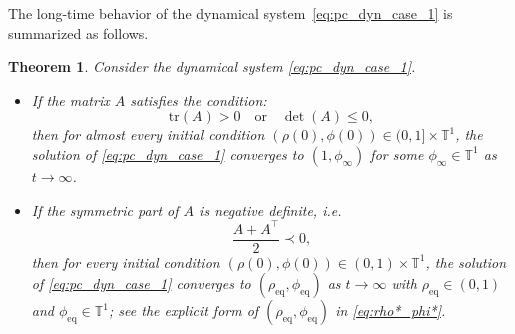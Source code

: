 \documentclass[10pt]{article}
\newtheorem{theorem}{Theorem}[section]
\theoremstyle{definition}
\theoremstyle{definition}
\numberwithin{equation}{section}
\newcommand{\BBT}{\mathbb{T}}
\newcommand{\aDMinus}{a_-^{\text{d}}}
\newcommand{\aOPlus}{a_+^{\text{o}}}
\newcommand{\tr}[1]{\mathrm{tr}(#1)}
\newcommand{\eq}{\mathrm{eq}}
\newcommand{\PhiA}{\Phi_{A}}
\begin{document}
The long-time behavior of the dynamical system~\eqref{eq:pc_dyn_case_1} is summarized as follows.

\begin{theorem}\label{thm:case_1}
Consider the dynamical system \eqref{eq:pc_dyn_case_1}.
\begin{itemize}
    \item[1.] If the matrix $A$ satisfies the condition:
    \begin{equation} \label{eq:case1_condition_E1}
    \tr{A} > 0 \quad \text{or} \quad  \det(A) \leq 0,
    \end{equation}
    then for almost every initial condition $(\rho(0), \phi(0)) \in (0,1] \times \BBT^1$, the solution of \eqref{eq:pc_dyn_case_1} converges to $(1, \phi_{\infty})$ for some $\phi_{\infty} \in \BBT^1$ as $t \rightarrow \infty$.

    \item[2.] If the symmetric part of $A$ is negative definite, i.e.
    \begin{equation}\label{eq:case1_condition_E2}
        \frac{A + A^{\top}}{2} \prec 0,
    \end{equation}
    then for every initial condition $(\rho(0), \phi(0)) \in (0,1) \times \BBT^1$, the solution of \eqref{eq:pc_dyn_case_1} converges to $(\rho_{\eq}, \phi_{\eq})$ as $t \rightarrow \infty$ with $\rho_{\eq} \in (0,1)$ and $\phi_{\eq} \in \BBT^1$; see the explicit form of $(\rho_{\eq}, \phi_{\eq})$ in \eqref{eq:rho*_phi*}.
\end{itemize}
\end{theorem}
\end{document}
